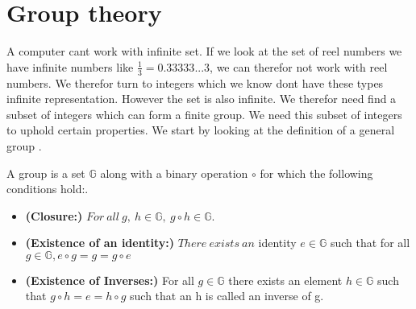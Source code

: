 
\section{Group theory} \label{sec:group_theory}
A computer cant work with infinite set. If we look at the set of reel numbers we have infinite numbers like $\frac{1}{3} = 0.33333...3$, we can therefor not work with reel numbers. We therefor turn to integers which we know dont have these types infinite representation. However the set is also infinite. We therefor need find a subset of integers which can form a finite group. We need this subset of integers to uphold certain properties. We start by looking at the definition of a general group \cite{Paar}.  

\begin{defi}
A \textnormal{group} is a set \begin{math}\mathbb{G}\end{math} along with a binary operation \begin{math}\circ \end{math} for which the following conditions hold:.
\begin{itemize}
\item \textnormal{\textbf{(Closure:)}}  \begin{math} For \ all \ g, \ h \in \mathbb{G},\ g \circ h \in \mathbb{G} \end{math}.
\item \textnormal{\textbf{(Existence of an identity:)}} \begin{math} There \ exists \ an \end{math} \textnormal{identity} \begin{math} e \in \mathbb{G} \end{math} such that for  all \begin{math} g \in \mathbb{G}, e \circ g = g =g \circ e \end{math}
\item \textnormal{\textbf{(Existence of Inverses:)}} For all \begin{math}g \in \mathbb{G}\end{math} there exists an element \begin{math}h \in \mathbb{G}\end{math} such that \begin{math}g \circ h = e =h \circ g \end{math} such that an h is called an \textnormal{inverse} of g.

\end{itemize}
\end{defi}
